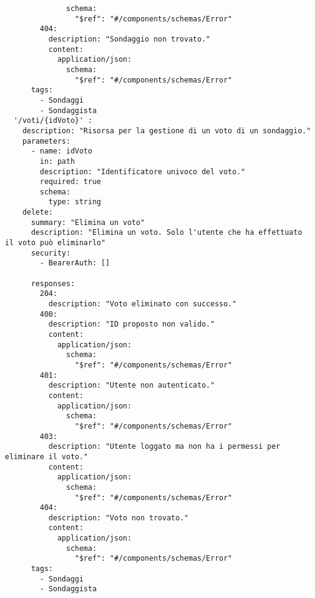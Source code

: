 \begin{verbatim}
              schema:
                "$ref": "#/components/schemas/Error"
        404:
          description: "Sondaggio non trovato."
          content:
            application/json:
              schema:
                "$ref": "#/components/schemas/Error"
      tags:
        - Sondaggi
        - Sondaggista
  '/voti/{idVoto}' :
    description: "Risorsa per la gestione di un voto di un sondaggio."
    parameters:
      - name: idVoto
        in: path
        description: "Identificatore univoco del voto."
        required: true
        schema:
          type: string
    delete:
      summary: "Elimina un voto"
      description: "Elimina un voto. Solo l'utente che ha effettuato il voto può eliminarlo"
      security:
        - BearerAuth: []
      
      responses:
        204:
          description: "Voto eliminato con successo."
        400:
          description: "ID proposto non valido."
          content:
            application/json:
              schema:
                "$ref": "#/components/schemas/Error"
        401:
          description: "Utente non autenticato."
          content:
            application/json:
              schema:
                "$ref": "#/components/schemas/Error"
        403:
          description: "Utente loggato ma non ha i permessi per eliminare il voto."
          content:
            application/json:
              schema:
                "$ref": "#/components/schemas/Error"
        404:
          description: "Voto non trovato."
          content:
            application/json:
              schema:
                "$ref": "#/components/schemas/Error"
      tags:
        - Sondaggi
        - Sondaggista
\end{verbatim}